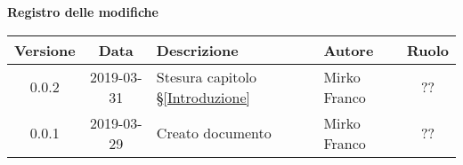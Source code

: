 	\begin{center}
		\textbf{Registro delle modifiche}
	\end{center}
	\begin{center}
		\begin{tabularx}{\textwidth}{|c|c|X|X|c|}
			\hline
			\textbf{Versione} & \textbf{Data} & \textbf{Descrizione} & \textbf{Autore} & \textbf{Ruolo} \\
			\hline
			0.0.2 & 2019-03-31 & Stesura capitolo \S\ref{Introduzione} & Mirko Franco & ?? \\
			\hline
			0.0.1 & 2019-03-29 & Creato documento & Mirko Franco & ?? \\
			\hline
		\end{tabularx}
	\end{center}
\newpage